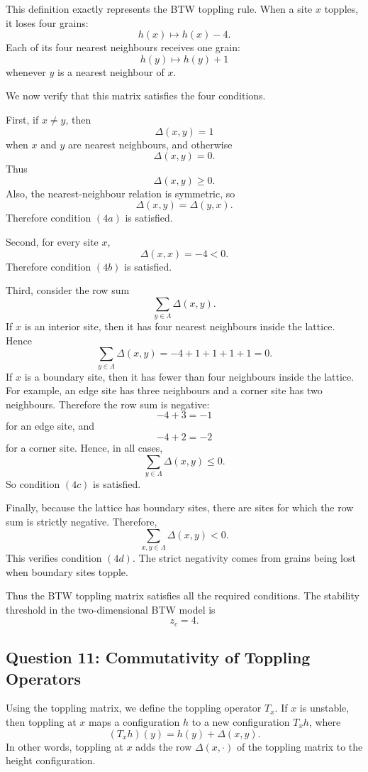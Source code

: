 This definition exactly represents the BTW toppling rule. When a site \(x\) topples, it loses
four grains:
\[
h(x) \mapsto h(x)-4.
\]
Each of its four nearest neighbours receives one grain:
\[
h(y) \mapsto h(y)+1
\]
whenever \(y\) is a nearest neighbour of \(x\).

We now verify that this matrix satisfies the four conditions.

First, if \(x \neq y\), then
\[
\Delta(x,y)=1
\]
when \(x\) and \(y\) are nearest neighbours, and otherwise
\[
\Delta(x,y)=0.
\]
Thus
\[
\Delta(x,y) \geq 0.
\]
Also, the nearest-neighbour relation is symmetric, so
\[
\Delta(x,y)=\Delta(y,x).
\]
Therefore condition \((4a)\) is satisfied.

Second, for every site \(x\),
\[
\Delta(x,x)=-4<0.
\]
Therefore condition \((4b)\) is satisfied.

Third, consider the row sum
\[
\sum_{y \in \Lambda} \Delta(x,y).
\]
If \(x\) is an interior site, then it has four nearest neighbours inside the lattice. Hence
\[
\sum_{y \in \Lambda} \Delta(x,y)
=
-4+1+1+1+1
=
0.
\]
If \(x\) is a boundary site, then it has fewer than four neighbours inside the lattice. For
example, an edge site has three neighbours and a corner site has two neighbours. Therefore
the row sum is negative:
\[
-4+3=-1
\]
for an edge site, and
\[
-4+2=-2
\]
for a corner site. Hence, in all cases,
\[
\sum_{y \in \Lambda} \Delta(x,y) \leq 0.
\]
So condition \((4c)\) is satisfied.

Finally, because the lattice has boundary sites, there are sites for which the row sum is
strictly negative. Therefore,
\[
\sum_{x,y \in \Lambda} \Delta(x,y) < 0.
\]
This verifies condition \((4d)\). The strict negativity comes from grains being lost when
boundary sites topple.

Thus the BTW toppling matrix satisfies all the required conditions. The stability threshold
in the two-dimensional BTW model is
\[
z_c=4.
\]

\subsection{Question 11: Commutativity of Toppling Operators}

Using the toppling matrix, we define the toppling operator \(T_x\). If \(x\) is unstable, then
toppling at \(x\) maps a configuration \(h\) to a new configuration \(T_x h\), where
\[
(T_xh)(y)
=
h(y)+\Delta(x,y).
\]
In other words, toppling at \(x\) adds the row \(\Delta(x,\cdot)\) of the toppling matrix to
the height configuration.

